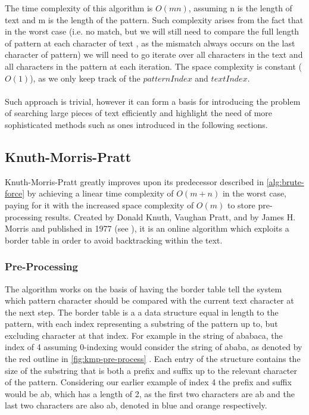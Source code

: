 \documentclass{l4proj}
\begin{document}


The time complexity of this algorithm is $O(mn)$, assuming n is the length of text and m is the length of the pattern. Such complexity arises from the fact that in the worst case (i.e. no match, but we will still need to compare the full length of pattern at each character of text , as the mismatch always occurs on the last character of pattern) we will need to go iterate over all characters in the text and all characters in the pattern at each iteration. The space complexity is constant ($O(1)$), as we only keep track of the $patternIndex$ and $textIndex$.
\\
\\
Such approach is trivial, however it can form a basis for introducing the problem of searching large pieces of text efficiently and highlight the need of more sophisticated methods such as ones introduced in the following sections.


\subsection{Knuth-Morris-Pratt}

Knuth-Morris-Pratt greatly improves upon its predecessor described in \ref{alg:brute-force} by achieving a linear time complexity of $O(m+n)$ in the worst case, paying for it with the increased space complexity of  $O(m)$ to store pre-processing results. Created by Donald Knuth, Vaughan Pratt, and by James H. Morris and published in 1977 (see \cite{KMP}), it is an online algorithm which exploits a border table in order to avoid backtracking within the text.
\\

\subsubsection{Pre-Processing}
The algorithm works on the basis of having the border table tell the system which pattern character should be compared with the current text character at the next step. The border table is a a data structure equal in length to the pattern, with each index representing a substring of the pattern up to, but excluding  character at that index. For example in the string of ababaca, the index of 4 assuming 0-indexing would consider the string of ababa, as denoted by the red outline in \ref{fig:kmp-pre-process} . Each entry of the structure contains the size of the substring that is both a prefix and suffix up to the relevant character of the pattern. Considering our earlier example of index 4 the prefix and suffix would be ab, which has a length of 2, as the first two characters are ab and the last two characters are also ab, denoted in blue and orange respectively.
\end{document}
